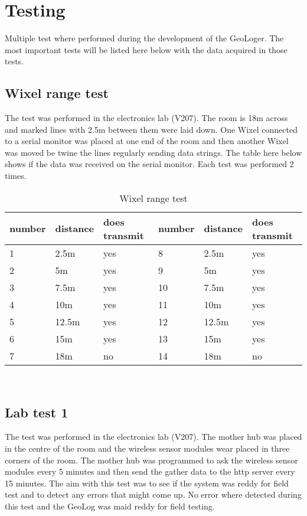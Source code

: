 \section{Testing}
Multiple test where performed during the development of the GeoLoger. The most important tests will be listed here below with the data acquired in those tests.

\subsection{Wixel range test}
The test was performed in the electronics lab (V207). The room is 18m across and marked lines with 2.5m  between them were laid down. One Wixel connected to a serial monitor was placed at one end of the room and then another Wixel was moved be twine the lines regularly sending data strings. The table here below shows if the data was received on the serial monitor. Each test was performed 2 times.
\begin{table}[H]
		 \centering
 	 	     \begin{tabular}
 	 	     	{| p{2cm} |  p{2cm} | p{3cm} | p{2cm}  | p{2cm} | p{3cm} |}
 	 	    	 \hline
 	 	    	  number & distance	& does transmit & number	& distance   & does transmit 			\\ \hline
 	 	  		 1 & 	2.5m & yes	& 8	 & 2.5m & yes \\ \hline
 	 	  		 2 &	5m	 & yes	& 9	 &   5m & yes \\ \hline 
 	 	  	 	 3 &	7.5m & yes	& 10 & 7.5m & yes \\ \hline 
 	 	  	 	 4 &    10m	 & yes  & 11 &	10m	& yes \\ \hline 
 	 	  	 	 5 &	12.5m& yes	& 12 & 12.5m& yes \\ \hline 
 	 	  	 	 6 &	15m	 & yes	& 13 &  15m & yes \\ \hline 
 	 	  	 	 7 &	18m	 & no	& 14 &  18m	& no  \\ \hline 
 
 	 	     \end{tabular}\\
 	 	     \label{table:Table_2}
 	 	     \caption{Wixel range test}
 	 	 \end{table}
 	 	 
\subsection{Lab test 1}
The test was performed in the electronics lab (V207). The mother hub was placed in the centre of the room and the wireless sensor modules wear placed in three corners of the room. The mother hub was programmed to ask the wireless sensor modules every 5 minutes and then send the gather data to the http server every 15 minutes. The aim with this test was to see if the system was reddy for field test and to detect any errors that might come up. No error where detected during this test and the GeoLog was maid reddy for field testing.

